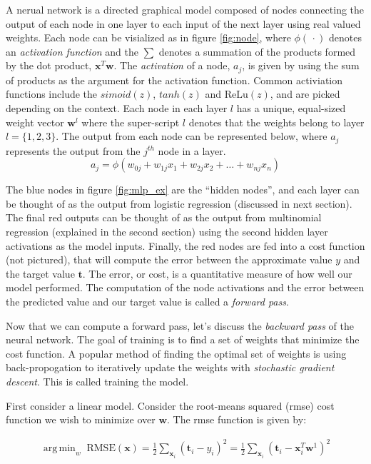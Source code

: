 \documentclass[11pt]{article}
\DeclareMathOperator*{\argmin}{arg\,min}
\begin{document}
A nerual network is a directed graphical model composed of nodes connecting the output of each node in one layer to each input of the next layer using real valued weights. Each node can be visialized as in figure \ref{fig:node}, where $\phi(\,\cdotp)$ denotes an \emph{activation function} and the $\sum$ denotes a summation of the products formed by the dot product, $\mathbf{x}^{T}\mathbf{w}$. The \emph{activation} of a node, $a_{j}$, is given by using the sum of products as the argument for the activation function. Common activiation functions include the $simoid(z)$, $tanh(z)$ and $\mathrm{ReLu}(z)$, and are picked depending on the context. Each node in each layer $l$ has a unique, equal-sized weight vector $\mathbf{w}^{l}$ where the super-script $l$ denotes that the weights belong to layer $l = \{1,2,3\}$. The output from each node can be represented below, where $a_j$ represents the output from the $j^{th}$ node in a layer.
\begin{equation}
  a_{j} = \phi\left(w_{0j} + w_{1j}x_{1} + w_{2j}x_{2} + \ldots + w_{nj}x_{n}\right)
\end{equation}
\par
The blue nodes in figure \ref{fig:mlp_ex} are the ``hidden nodes'', and each layer can be thought of as the output from logistic regression (discussed in next section). The final red outputs can be thought of as the output from multinomial regression (explained in the second section) using the second hidden layer activations as the model inputs. Finally, the red nodes are fed into a cost function (not pictured), that will compute the error between the approximate value $y$ and the target value $\mathbf{t}$. The error, or cost, is a quantitative measure of how well our model performed. The computation of the node activations and the error between the predicted value and our target value is called a \emph{forward pass}.
\par
Now that we can compute a forward pass, let's discuss the \emph{backward pass} of the neural network. The goal of training is to find a set of weights that minimize the cost function. A popular method of finding the optimal set of weights is using back-propogation to iteratively update the weights with \emph{stochastic gradient descent}. This is called training the model.

First consider a linear model. Consider the root-means squared (rmse) cost function we wish to minimize over $\mathbf{w}$. The rmse function is given by:

\[
  \begin{aligned}
    \argmin_{w} \;\mathrm{RMSE}(\mathbf{x}) = \frac{1}{2}\sum_{\mathbf{x}_{i}} \left(\mathbf{t}_{i} - y_{i}\right)^{2} = \frac{1}{2}\sum_{\mathbf{x}_{i}} \left(\mathbf{t}_{i} - \mathbf{x}_{i}^{T}\mathbf{w}^{1}\right)^{2}
  \end{aligned}
\]
\end{document}

